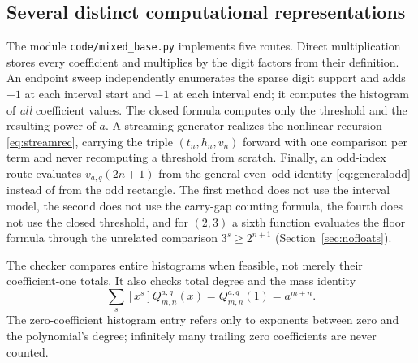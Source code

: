 \documentclass[11pt,letterpaper]{article}
\numberwithin{equation}{section}
\theoremstyle{definition}
\theoremstyle{remark}
\begin{document}
\subsection{Several distinct computational representations}
The module \texttt{code/mixed\_base.py} implements five routes.
Direct multiplication stores every coefficient and multiplies by the digit
factors from their definition. An endpoint sweep independently enumerates
the sparse digit support and adds $+1$ at each interval start and $-1$ at
each interval end; it computes the histogram of \emph{all} coefficient
values. The closed formula computes only the threshold and the resulting
power of $a$. A streaming generator realizes the nonlinear recursion
\eqref{eq:streamrec}, carrying the triple $(t_n,h_n,v_n)$ forward with one
comparison per term and never recomputing a threshold from scratch.
Finally, an odd-index route evaluates $v_{a,q}(2n+1)$ from the general
even--odd identity \eqref{eq:generalodd} instead of from the odd rectangle.
The first method does not use the interval model, the second does not use
the carry-gap counting formula, the fourth does not use the closed
threshold, and for $(2,3)$ a sixth function evaluates the floor formula
through the unrelated comparison $3^s\ge2^{n+1}$
(Section~\ref{sec:nofloats}).

The checker compares entire histograms when feasible, not merely their
coefficient-one totals. It also checks total degree and the mass identity
\[
 \sum_s[x^s]Q^{a,q}_{m,n}(x)=Q^{a,q}_{m,n}(1)=a^{m+n}.
\]
The zero-coefficient histogram entry refers only to exponents between zero
and the polynomial's degree; infinitely many trailing zero coefficients
are never counted.
\end{document}
